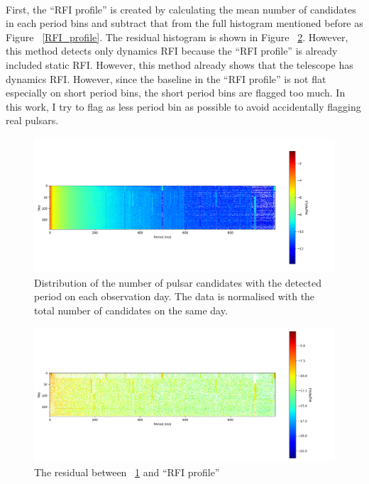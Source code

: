 \documentclass[thesis_msc.tex]{subfiles}
\begin{document}
    \paragraph{} First, the ``RFI profile'' is created by calculating the mean number of candidates in each period bins and subtract that from the full histogram mentioned before as Figure ~\ref{RFI_profile}. The residual histogram is shown in Figure ~\ref{RFI_I}. However, this method detects only dynamics RFI because the ``RFI profile'' is already included static RFI. However, this method already shows that the telescope has dynamics RFI. However, since the baseline in the  ``RFI profile'' is not flat especially on short period bins, the short period bins are flagged too much. In this work, I try to flag as less period bin as possible to avoid accidentally flagging real pulsars. 

\begin{figure}[h!] 
\centering
\includegraphics[width=1.0\textwidth]{figures/Full_log.png}
\caption{Distribution of the number of pulsar candidates with the detected period on each observation day. The data is normalised with the total number of candidates on the same day.}
\label{RFI_II}
\end{figure}

\begin{figure}[h!] 
\centering
\includegraphics[width=1.0\textwidth]{figures/RFI_mit.png}
\caption{The residual between ~\ref{RFI_II} and ``RFI profile'' }
\label{RFI_I}
\end{figure}
\end{document}
